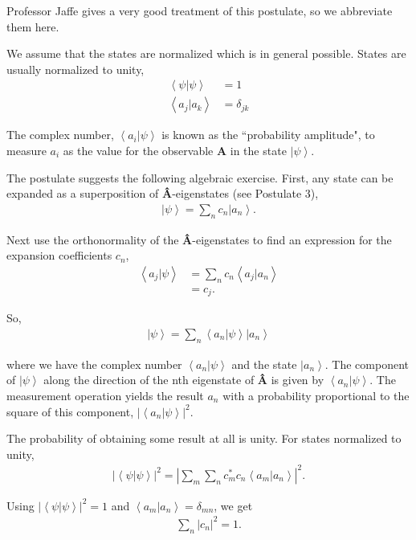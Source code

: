 \documentclass[11pt]{article} %
\newcommand{\ket}[1]{\left|#1\right\rangle}
\newcommand{\braket}[2]{\left\langle#1 |  #2\right\rangle}
\begin{document}
Professor Jaffe gives a very good treatment of this postulate, so we abbreviate them here.

We assume that the states are normalized which is in general possible. States are usually normalized to unity,
\begin{align}
    \braket{\psi}{\psi} &= 1\nonumber\\
    \braket{a_j}{a_k} &= \delta_{jk}
\end{align}

The complex number, $\braket{a_i}{\psi}$ is known as the ``probability amplitude", to measure $a_i$ as the value for the observable \textbf{A} in the state $\ket{\psi}$.

The postulate suggests the following algebraic exercise. First, any state can be expanded as a superposition of \textbf{\^A}-eigenstates (see Postulate 3),
\begin{align}
    \ket{\psi} = \sum_nc_n\ket{a_n}.
\end{align}

Next use the orthonormality of the \textbf{\^A}-eigenstates to find an expression for the expansion coefficients $c_n$,
\begin{align}
    \braket{a_j}{\psi} &= \sum_nc_n\braket{a_j}{a_n}\\
    &= c_j.
\end{align}

So,
\begin{align}
    \ket{\psi} = \sum_n\braket{a_n}{\psi}\ket{a_n}
\end{align}

where we have the complex number $\braket{a_n}{\psi}$ and the state $\ket{a_n}$. The component of $\ket{\psi}$ along the direction of the nth eigenstate of \textbf{\^A} is given by $\braket{a_n}{\psi}$. The measurement operation yields the result $a_n$ with a probability proportional to the square of this component, $\left|\braket{a_n}{\psi}\right|^2$.

The probability of obtaining some result at all is unity. For states normalized to unity,
\begin{align}
    \left|\braket{\psi}{\psi}\right|^2 = \left|\sum_m\sum_nc_m^\ast c_n\braket{a_m}{a_n}\right|^2.
\end{align}

Using $\left|\braket{\psi}{\psi}\right|^2 = 1$ and $\braket{a_m}{a_n} = \delta_{mn}$, we get
\begin{align}
    \sum_n\left|c_n\right|^2 = 1.
\end{align}
\end{document}
